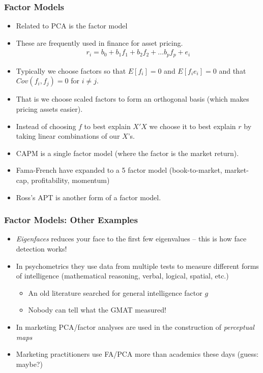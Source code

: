 \documentclass[xcolor=pdftex,dvipsnames,table,mathserif,aspectratio=169]{beamer}
\begin{document}
\begin{frame}
\small
\frametitle{Factor Models}
\begin{itemize}
\item Related to PCA is the \alert{factor model}
\item These are frequently used in finance for asset pricing. 
\begin{eqnarray*}
r_i = b_0 + b_1 f_1 + b_2 f_2 + \ldots b_p f_p + e_i
\end{eqnarray*}
\item Typically we choose factors so that $E[f_i] = 0$ and $E[f_i e_i] = 0$ and that $Cov(f_i,f_j) = 0$ for $i \neq j$.
\item That is we choose scaled factors to form an orthogonal basis (which makes pricing assets easier).
\item Instead of choosing $f$ to best explain $X'X$ we choose it to best explain $r$ by taking linear combinations of our $X$'s.
\item CAPM is a single factor model (where the factor is the \alert{market return}).
\item Fama-French have expanded to a 5 factor model (book-to-market, market-cap, profitability, momentum)
\item Ross's APT is another form of a factor model.
\end{itemize}
\end{frame}

\begin{frame}
\frametitle{Factor Models: Other Examples}
\small
\begin{itemize}
\item \textit{Eigenfaces} reduces your face to the first few eigenvalues -- this is how face detection works!
\item In psychometrics they use data from multiple tests to measure different forms of intelligence (mathematical reasoning, verbal, logical, spatial, etc.)
\begin{itemize}
\item An old literature searched for general intelligence factor $g$
\item Nobody can tell what the GMAT measured!
\end{itemize}
\item In marketing PCA/factor analyses are used in the construction of \textit{perceptual maps}
\item Marketing practitioners use FA/PCA more than academics these days (guess: maybe?)
\end{itemize}
\end{frame}
\end{document}
